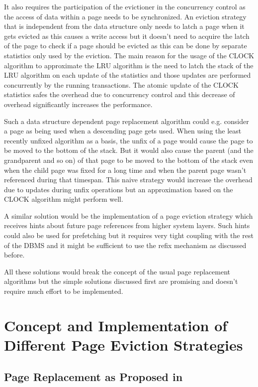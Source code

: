 	It also requires the participation of the evictioner in the concurrency control as the access of data within a page needs to be synchronized. An eviction strategy that is independent from the data structure only needs to latch a page when it gets evicted as this causes a write access but it doesn't need to acquire the latch of the page to check if a page should be evicted as this can be done by separate statistics only used by the eviction. The main reason for the usage of the CLOCK algorithm to approximate the LRU algorithm is the need to latch the stack of the LRU algorithm on each update of the statistics and those updates are performed concurrently by the running transactions. The atomic update of the CLOCK statistics safes the overhead due to concurrency control and this decrease of overhead significantly increases the performance.
	
	Such a data structure dependent page replacement algorithm could e.g. consider a page as being used when a  descending page gets used. When using the least recently unfixed algorithm as a basis, the unfix of a page would cause the page to be moved to the bottom of the stack. But it would also cause the parent (and the grandparent and so on) of that page to be moved to the bottom of the stack even when the child page was fixed for a long time and when the parent page wasn't referenced during that timespan. This naive strategy would increase the overhead due to updates during unfix operations but an approximation based on the CLOCK algorithm might perform well.
	
	A similar solution would be the implementation of a page eviction strategy which receives hints about future page references from higher system layers. Such hints could also be used for prefetching but it requires very tight coupling with the rest of the DBMS and it might be sufficient to use the refix mechanism as discussed before.
	
	All these solutions would break the concept of the usual page replacement algorithms but the simple solutions discussed first are promising and doesn't require much effort to be implemented.

\section{Concept and Implementation of Different Page Eviction Strategies}

\subsection{Page Replacement as Proposed in \cite{Graefe:2014}}


